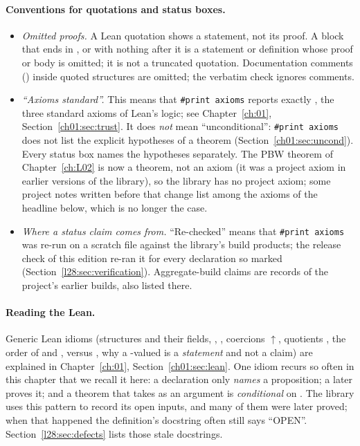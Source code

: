 \paragraph{Conventions for quotations and status boxes.}
\begin{itemize}
\item \emph{Omitted proofs.} A Lean quotation shows a statement, not its proof. A block that ends in \lean{:=},
   or  with nothing after it is a statement or definition whose proof or body is
  omitted; it is not a truncated quotation. Documentation comments () inside quoted
  structures are omitted; the verbatim check ignores comments.
\item \emph{``Axioms standard''.} This means that \texttt{\#print axioms} reports exactly
  , the three standard axioms of Lean's logic; see
  Chapter~\ref{ch:01}, Section~\ref{ch01:sec:trust}. It does \emph{not} mean ``unconditional'':
  \texttt{\#print axioms} does not list the explicit hypotheses of a theorem (Section~\ref{ch01:sec:uncond}). Every
  status box names the hypotheses separately. The PBW theorem  of
  Chapter~\ref{ch:L02} is now a theorem, not an axiom (it was a project axiom in earlier versions of the library), so the library has no project axiom; some project notes written
  before that change list  among the axioms of the headline below, which is no longer the case.
\item \emph{Where a status claim comes from.} ``Re-checked'' means that \texttt{\#print axioms} was re-run on a scratch file
  against the library's build products; the release check of this edition re-ran it for every declaration so marked
  (Section~\ref{l28:sec:verification}). Aggregate-build claims are records of the project's earlier builds, also listed there.
\end{itemize}

\paragraph{Reading the Lean.} Generic Lean idioms (structures and their fields, ,
, coercions $\uparrow$, quotients , the order of  and , 
versus , why a -valued  is a \emph{statement} and not a claim) are explained in
Chapter~\ref{ch:01}, Section~\ref{ch01:sec:lean}. One idiom recurs so often in this chapter that we recall it here:
a declaration  only \emph{names} a proposition; a later  proves it; and a
theorem that takes  as an argument is \emph{conditional} on . The library uses this pattern to
record its open inputs, and many of them were later proved; when that happened the definition's docstring often
still says ``OPEN''. Section~\ref{l28:sec:defects} lists those stale docstrings.

